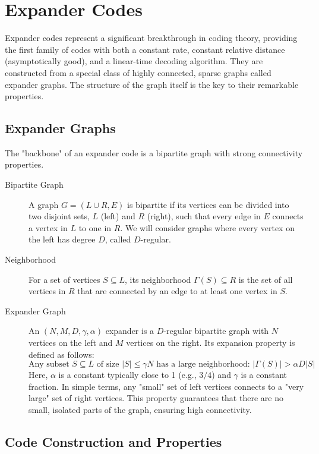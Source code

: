 
\section{Expander Codes}

Expander codes represent a significant breakthrough in coding theory, providing the first family of codes with both a constant rate, constant relative distance (asymptotically good), and a linear-time decoding algorithm. They are constructed from a special class of highly connected, sparse graphs called expander graphs. The structure of the graph itself is the key to their remarkable properties.

\subsection{Expander Graphs}

The "backbone" of an expander code is a bipartite graph with strong connectivity properties.

\begin{description}
    \item[Bipartite Graph] A graph $G=(L \cup R, E)$ is bipartite if its vertices can be divided into two disjoint sets, $L$ (left) and $R$ (right), such that every edge in $E$ connects a vertex in $L$ to one in $R$. We will consider graphs where every vertex on the left has degree $D$, called $D$-regular.

    \item[Neighborhood] For a set of vertices $S \subseteq L$, its neighborhood $\Gamma(S) \subseteq R$ is the set of all vertices in $R$ that are connected by an edge to at least one vertex in $S$.

    \item[Expander Graph] An $(N, M, D, \gamma, \alpha)$ expander is a $D$-regular bipartite graph with $N$ vertices on the left and $M$ vertices on the right. Its expansion property is defined as follows:
    \[
        \text{Any subset } S \subseteq L \text{ of size } |S| \le \gamma N \text{ has a large neighborhood: } |\Gamma(S)| > \alpha D |S|
    \]
    Here, $\alpha$ is a constant typically close to 1 (e.g., $3/4$) and $\gamma$ is a constant fraction. In simple terms, any "small" set of left vertices connects to a "very large" set of right vertices. This property guarantees that there are no small, isolated parts of the graph, ensuring high connectivity.
\end{description}

\subsection{Code Construction and Properties}

